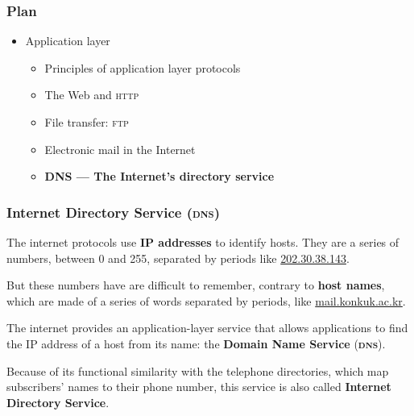 
%
\begin{frame}
\frametitle{Plan}

\begin{itemize}

  \item Application layer

  \begin{itemize}

    \item Principles of application layer protocols

    \item The Web and \textsc{http}

    \item File transfer: \textsc{ftp}

    \item Electronic mail in the Internet

    \item \textbf{DNS --- The Internet's directory service}

  \end{itemize}

\end{itemize}

\end{frame}

%
\begin{frame}
\frametitle{Internet Directory Service (\textsc{dns})}

The internet protocols use \textbf{IP addresses} to identify
hosts. They are a series of numbers, between 0 and 255, separated by
periods like \url{202.30.38.143}.

But these numbers have are difficult to remember, contrary to
\textbf{host names}, which are made of a series of words separated by
periods, like \url{mail.konkuk.ac.kr}.

The internet provides an application-layer service that allows
applications to find the IP address of a host from its name: the
\textbf{Domain Name Service} (\textbf{\textsc{dns}}). 

Because of its functional similarity with the telephone directories,
which map subscri\-bers' names to their phone number, this service is
also called \textbf{Internet Directory Service}.

\end{frame}


